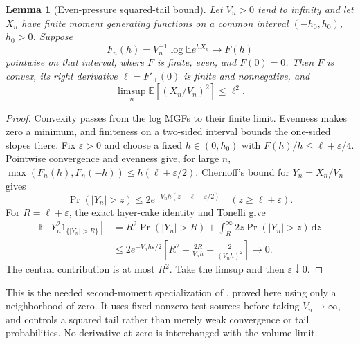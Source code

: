 \documentclass[11pt]{article}
\numberwithin{equation}{section}
\newtheorem{lemma}[theorem]{Lemma}
\theoremstyle{definition}
\newcommand{\E}{\mathbb E}
\newcommand{\dd}{\,\mathrm d}
\newcommand{\eps}{\varepsilon}
\begin{document}
\begin{lemma}[Even-pressure squared-tail bound]
\label{lem:griffiths-endpoint}
Let $V_n>0$ tend to infinity and let $X_n$ have finite moment generating
functions on a common interval $(-h_0,h_0)$, $h_0>0$.  Suppose
\[
 F_n(h)=V_n^{-1}\log\E e^{hX_n}\longrightarrow F(h)
\]
pointwise on that interval, where $F$ is finite, even, and $F(0)=0$.
Then $F$ is convex, its right derivative $\ell=F'_+(0)$ is finite and
nonnegative, and
\begin{equation}
 \limsup_n\E[(X_n/V_n)^2]\leq\ell^2. \label{eq:griffiths-tail}
\end{equation}
\end{lemma}

\begin{proof}
Convexity passes from the log MGFs to their finite limit. Evenness makes
zero a minimum, and finiteness on a two-sided interval bounds the one-sided
slopes there.  Fix $\eps>0$ and choose a fixed $h\in(0,h_0)$ with
$F(h)/h\leq\ell+\eps/4$.
Pointwise convergence and evenness give, for large $n$,
$\max(F_n(h),F_n(-h))\leq h(\ell+\eps/2)$.  Chernoff's bound for
$Y_n=X_n/V_n$ gives
\[
 \Pr(|Y_n|>z)\leq2e^{-V_nh(z-\ell-\eps/2)}
 \quad(z\geq\ell+\eps).
\]
For $R=\ell+\eps$, the exact layer-cake identity and Tonelli give
\begin{align}
 \E[Y_n^2 1_{\{|Y_n|>R\}}]
 &=R^2\Pr(|Y_n|>R)+\int_R^\infty2z\Pr(|Y_n|>z)\dd z\nonumber\\
 &\leq2e^{-V_nh\eps/2}\left[R^2+\frac{2R}{V_nh}
                         +\frac2{(V_nh)^2}\right]\longrightarrow0.
 \label{eq:griffiths-squared-tail}
\end{align}
The central contribution is at most $R^2$.  Take the limsup and then
$\eps\downarrow0$.
\end{proof}

This is the needed second-moment specialization of
\cite[Proposition 3.9, (3.23)--(3.24)]{KKK}, proved here using only a
neighborhood of zero.  It uses fixed nonzero test sources before taking
$V_n\to\infty$, and controls a squared tail rather than merely weak
convergence or tail probabilities.  No derivative at zero is interchanged
with the volume limit.
\end{document}
